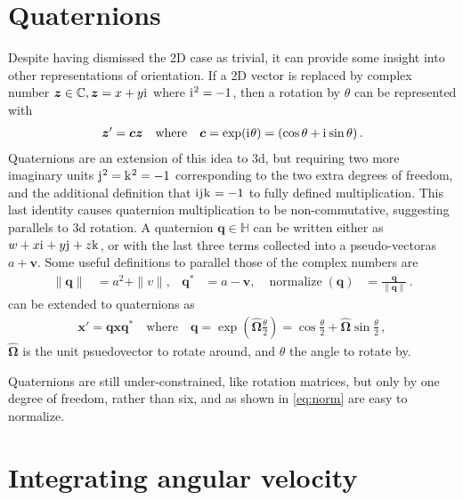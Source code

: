\documentclass[main.tex]{subfiles}
\begin{document}
\section{Quaternions}
	\label{sec:quat:intro}

	Despite having dismissed the 2D case as trivial, it can provide some insight into other representations of orientation.
	If a 2D vector is replaced by complex number $\bm{z} \in \mathbb{C}, \bm{z} = x+y\mathrm{i}\mkern1mu$ where $\mathrm{i}\mkern1mu^2 = -1$, then a rotation by $\theta$ can be represented with
	\begin{align}
		\bm{z}' = \bm{c}\bm{z} \quad \text{where} \quad \bm{c} = \exp(\mathrm{i}\mkern1mu\theta) = (\cos \theta + \mathrm{i}\mkern1mu \sin \theta)\,.
		\label{eq:rot:complex}
	\end{align}
	Quaternions are an extension of this idea to 3d, but requiring two more imaginary units $\mathrm{j}\mkern1mu^2 = \mathrm{k}\mkern1mu^2 = -1$ corresponding to the two extra degrees of freedom, and the additional definition that $\mathrm{i}\mkern1mu\mathrm{j}\mkern1mu\mathrm{k}\mkern1mu = -1$ to fully defined multiplication.
	This last identity causes quaternion multiplication to be non-commutative, suggesting parallels to 3d rotation.
	A quaternion $\bm{q} \in \mathbb{H}$ can be written either as $w + x\mathrm{i}\mkern1mu + y\mathrm{j}\mkern1mu + z\mathrm{k}\mkern1mu$, or with the last three terms collected into a pseudo-vector\footnotemark as $a + \bm{v}$. Some useful definitions to parallel those of the complex numbers are
	\begin{align}
		\|\bm{q}\| &= a^2 + \|v\|, &
		\bm{q}^* &= a - \bm{v}, &
		\operatorname{normalize}(\bm{q}) &= \frac{\bm{q}}{\|\bm{q}\|}\,.
		\label{eq:norm}
	\end{align}
	 can be extended to quaternions as
	\begin{align}
		\bm{x}' = \bm{q} \bm{x} \bm{q}^* \quad \text{where} \quad
		\bm{q} = \exp\left(\hat{\bm{\Omega}}\tfrac{\theta}{2}\right) = \cos \tfrac{\theta}{2} + \hat{\bm{\Omega}} \sin \tfrac{\theta}{2}\,,
		\label{eq:quat:exp}
	\end{align}
	$\hat{\bm{\Omega}}$ is the unit psuedovector to rotate around, and $\theta$ the angle to rotate by.

	Quaternions are still under-constrained, like rotation matrices, but only by one degree of freedom, rather than six, and as shown in \cref{eq:norm} are easy to normalize.

\section{Integrating angular velocity}
\label{sec:quat:int}
\end{document}
